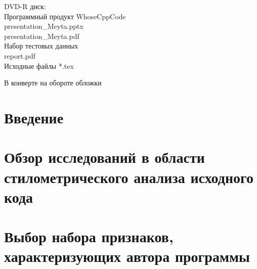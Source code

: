 
 

\newpage
%  
 
 \newpage
%  
 
 
 
 
 \newpage
{}
 \tableofcontents
 
\vspace{1cm}
 
 
\begin{singlespace}
 \begin{minipage}[left]{0.6\linewidth}
 DVD-R диск:\\
 Программный продукт WhoseCppCode\\
 presentation\_Meyta.pptx\\
 presentation\_Meyta.pdf\\
 Набор тестовых данных\\
 report.pdf\\
 Исходные файлы *.tex\\
 \end{minipage}
 \hfill
 \begin{minipage}[right]{0.3\linewidth}
 В конверте на обороте обложки
 \end{minipage}
\end{singlespace}
 

\clearpage
\setcounter{section}{0}
\section*{Введение}


% 


\clearpage
\section{Обзор исследований в области стилометрического анализа исходного кода}



\clearpage
\section{Выбор набора признаков, характеризующих автора программы}\label{features}
 
 
